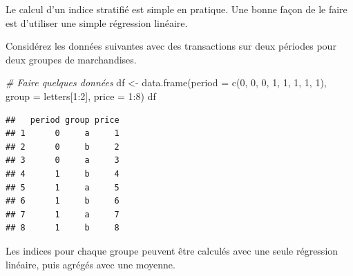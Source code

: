 \documentclass[
]{article}
\newenvironment{Shaded}{\begin{snugshade}}{\end{snugshade}}
\newcommand{\AttributeTok}[1]{\textcolor[rgb]{0.77,0.63,0.00}{#1}}
\newcommand{\CommentTok}[1]{\textcolor[rgb]{0.56,0.35,0.01}{\textit{#1}}}
\newcommand{\DecValTok}[1]{\textcolor[rgb]{0.00,0.00,0.81}{#1}}
\newcommand{\FunctionTok}[1]{\textcolor[rgb]{0.00,0.00,0.00}{#1}}
\newcommand{\NormalTok}[1]{#1}
\newcommand{\OtherTok}[1]{\textcolor[rgb]{0.56,0.35,0.01}{#1}}
\newcommand{\SpecialCharTok}[1]{\textcolor[rgb]{0.00,0.00,0.00}{#1}}
\begin{document}
Le calcul d'un indice stratifié est simple en pratique. Une bonne façon de le faire est d'utiliser une simple régression linéaire.

Considérez les données suivantes avec des transactions sur deux périodes pour deux groupes de marchandises.

\begin{Shaded}
\begin{Highlighting}[]
\CommentTok{\# Faire quelques données}
\NormalTok{df }\OtherTok{\textless{}{-}} \FunctionTok{data.frame}\NormalTok{(}\AttributeTok{period =} \FunctionTok{c}\NormalTok{(}\DecValTok{0}\NormalTok{, }\DecValTok{0}\NormalTok{, }\DecValTok{0}\NormalTok{, }\DecValTok{1}\NormalTok{, }\DecValTok{1}\NormalTok{, }\DecValTok{1}\NormalTok{, }\DecValTok{1}\NormalTok{, }\DecValTok{1}\NormalTok{), }
                 \AttributeTok{group =}\NormalTok{ letters[}\DecValTok{1}\SpecialCharTok{:}\DecValTok{2}\NormalTok{],}
                 \AttributeTok{price =} \DecValTok{1}\SpecialCharTok{:}\DecValTok{8}\NormalTok{)}
\NormalTok{df}
\end{Highlighting}
\end{Shaded}

\begin{verbatim}
##   period group price
## 1      0     a     1
## 2      0     b     2
## 3      0     a     3
## 4      1     b     4
## 5      1     a     5
## 6      1     b     6
## 7      1     a     7
## 8      1     b     8
\end{verbatim}

Les indices pour chaque groupe peuvent être calculés avec une seule régression linéaire, puis agrégés avec une moyenne.

\begin{Shaded}
\end{Shaded}
\end{document}
